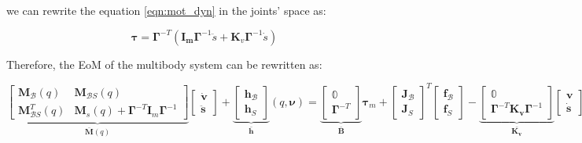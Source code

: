 we can rewrite the equation \ref{eqn:mot_dyn} in the joints' space as:

\begin{equation}
    \label{eqn:mot_dyn_jointspace}
    \boldsymbol{\tau} = \boldsymbol{\Gamma} ^{-T} (\mathbf{I_m}\boldsymbol{\Gamma} ^{-1} \ddot{s} + \mathbf{K}_v \boldsymbol{\Gamma} ^{-1}\dot{s})
\end{equation}

Therefore, the \ac{EoM} of the multibody system can be rewritten as:

\begin{equation}
    \underbrace{\begin{bmatrix}
            \mathbf{M} _{\mathcal{B}}(q)     & \mathbf{M} _{\mathcal{B}S}(q)                                                      \\
            \mathbf{M} _{\mathcal{B}S} ^T(q) & \mathbf{M} _s(q) + \boldsymbol{\Gamma} ^{-T}\mathbf{I} _m\boldsymbol{\Gamma} ^{-1}
        \end{bmatrix}} _{\mathbf{\bar{M}}(q)}
    \begin{bmatrix}
        \dot{\mathrm{\mathbf{v}}} \\
        \ddot{\mathbf{s}}
    \end{bmatrix}+
    \underbrace{\begin{bmatrix}
            \mathbf{h} _{\mathcal{B}} \\
            \mathbf{h} _S
        \end{bmatrix}} _\mathbf{\bar{h}}(q,\boldsymbol{\nu}) =
    \underbrace{\begin{bmatrix}
            \mathbb{0} \\
            \boldsymbol{\Gamma} ^{-T}
        \end{bmatrix}} _{\mathbf{\bar{B}}}
    \boldsymbol{\tau} _m
    +
    \begin{bmatrix}
        \mathbf{J} _{\mathcal{B}} \\
        \mathbf{J} _S
    \end{bmatrix} ^T
    \begin{bmatrix}
        \mathbf{f} _{\mathcal{B}} \\
        \mathbf{f} _S
    \end{bmatrix}-
    \underbrace{\begin{bmatrix}
            \mathbb{0} \\
            \boldsymbol{\Gamma} ^{-T}\mathbf{K _v}\boldsymbol{\Gamma} ^{-1}
        \end{bmatrix}} _\mathbf{\bar{K _v}}
    \begin{bmatrix}
        \mathrm{\mathbf{v}} \\
        \dot{\mathbf{s}}
    \end{bmatrix}
\end{equation}

